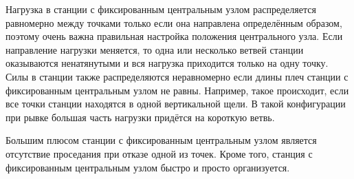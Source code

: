 \documentclass[fleqn, 12pt]{extarticle}
\begin{document}
    Нагрузка в станции с фиксированным центральным узлом распределяется равномерно между точками только если она направлена определённым образом,
    поэтому очень важна правильная настройка положения центрального узла. Если направление нагрузки меняется, то одна или несколько ветвей станции оказываются ненатянутыми и вся нагрузка приходится
    только на одну точку. Силы в станции также распределяются неравномерно если длины плеч станции с фиксированным центральным узлом не равны.
    Например, такое происходит, если все точки станции находятся в одной вертикальной щели.
    В такой конфигурации при рывке большая часть нагрузки придётся на короткую ветвь.
    
    Большим плюсом станции с фиксированным центральным узлом является отсутствие проседания при отказе одной из точек. Кроме того, станция с фиксированным центральным узлом
    быстро и просто организуется.
\end{document}
